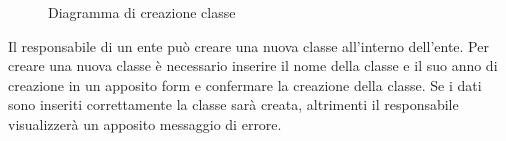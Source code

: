\documentclass[a4paper, titlepage]{article}
\begin{document}
\newpage
{}
\begin{figure}[H]
	\centering
	\noindent{}
	\caption{Diagramma di creazione classe}
\end{figure}
Il responsabile di un ente può creare una nuova classe all'interno dell'ente. Per creare una nuova classe è necessario inserire il nome della classe e il suo anno di creazione in un apposito form e confermare la creazione della classe. Se i dati sono inseriti correttamente la classe sarà creata, altrimenti il responsabile visualizzerà un apposito messaggio di errore.
\end{document}
